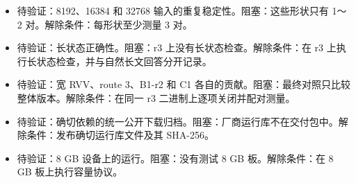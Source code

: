 \documentclass[10pt,a4paper,fontset=none]{ctexart}
\providecommand{\tightlist}{\setlength{\itemsep}{0pt}\setlength{\parskip}{0pt}}
\begin{document}
\begin{itemize}
\tightlist
\item
  待验证：8192、16384 和 32768 输入的重复稳定性。阻塞：这些形状只有 1～2
  对。解除条件：每形状至少测量 3 对。
\item
  待验证：长状态正确性。阻塞：r3 上没有长状态检查。解除条件：在 r3
  上执行长状态检查，并与自然长文回答分开记录。
\item
  待验证：宽 RVV、route 3、B1-r2 和 C1
  各自的贡献。阻塞：最终对照只比较整体版本。解除条件：在同一 r3
  二进制上逐项关闭并配对测量。
\item
  待验证：确切依赖的统一公开下载归档。阻塞：厂商运行库不在交付包中。解除条件：发布确切运行库文件及其
  SHA-256。
\item
  待验证：8 GB 设备上的运行。阻塞：没有测试 8 GB 板。解除条件：在 8 GB
  板上执行容量协议。
\end{itemize}
\end{document}
